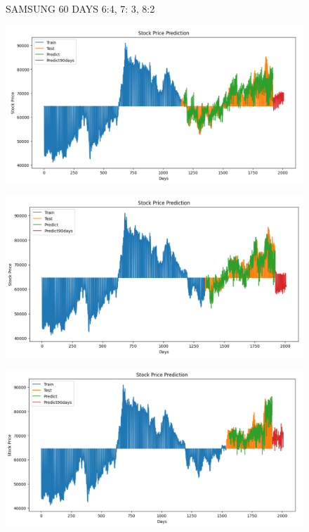 \documentclass{article}
\begin{document}
\begin{multicols}{2}
\begin{figure}[H]
\begin{minipage}{0.15\textwidth}
    \label{fig:3}
    \end{minipage}
    \caption{SAMSUNG 60 DAYS  6:4, 7: 3, 8:2 }
\end{figure}


\begin{figure}[H]
    \centering
    \begin{minipage}{0.15\textwidth}
    \centering
    \includegraphics[width=1\textwidth]{Image/N_Beat/N_BEAT_6_4_SAMSUNG_90DAYS.png}
   
    \label{fig:1}
    \end{minipage}%
    \begin{minipage}{0.15\textwidth}
    \centering
    \includegraphics[width=1\textwidth]{Image/N_Beat/N_BEAT_7_3_SAMSUNG_90DAYS.png}
  
    \label{fig:2}
    \end{minipage}%
    \begin{minipage}{0.15\textwidth}
    \centering
    \includegraphics[width=1\textwidth]{Image/N_Beat/N_BEAT_8_2_SAMSUNG_90DAYS.png}


\end{minipage}
\end{figure}
\end{multicols}
\end{document}
